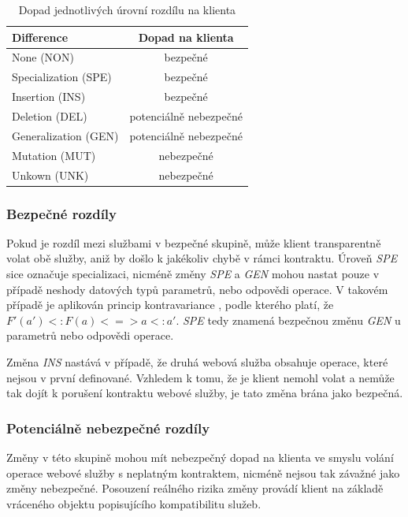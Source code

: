 \documentclass[czech,DP]{thesiskiv}
\begin{document}
\begin{table}[h!]
	\centering
	\begin{tabular}{|l|c|}
		\hline
		Difference & Dopad na klienta  \\
		\hline
		\hline
		None (NON) & bezpečné \\
		\hline
		Specialization (SPE) & bezpečné  \\
		\hline
		Insertion (INS) & bezpečné \\
		\hline
		Deletion (DEL) & potenciálně nebezpečné \\
		\hline
		Generalization (GEN) & potenciálně nebezpečné \\
		\hline
		Mutation (MUT) & nebezpečné \\
		\hline
		Unkown (UNK) & nebezpečné \\
		\hline
	\end{tabular}
	\caption{Dopad jednotlivých úrovní rozdílu na klienta }
	\label{tab:diff-level}
\end{table}

\subsubsection{Bezpečné rozdíly}

Pokud je rozdíl mezi službami v bezpečné skupině, může klient transparentně volat obě služby, aniž by došlo k jakékoliv chybě v rámci kontraktu. Úroveň \textit{SPE} sice označuje specializaci, nicméně změny \textit{SPE} a \textit{GEN} mohou nastat pouze v případě neshody datových typů parametrů, nebo odpovědi operace. V takovém případě je aplikován princip kontravariance \cite{abadi1995subytping}, podle kterého platí, že $F'(a') <: F(a) <=> a <: a'$. \textit{SPE} tedy znamená bezpečnou změnu \textit{GEN} u parametrů nebo odpovědi operace. 

Změna \textit{INS} nastává v případě, že druhá webová služba obsahuje operace, které nejsou v první definované. Vzhledem k tomu, že je klient nemohl volat a nemůže tak dojít k porušení kontraktu webové služby, je tato změna brána jako bezpečná.

\subsubsection{Potenciálně nebezpečné rozdíly}

Změny v této skupině mohou mít nebezpečný dopad na klienta ve smyslu volání operace webové služby s neplatným kontraktem, nicméně nejsou tak závažné jako změny nebezpečné. Posouzení reálného rizika změny provádí klient na základě vráceného objektu popisujícího kompatibilitu služeb.
\end{document}
